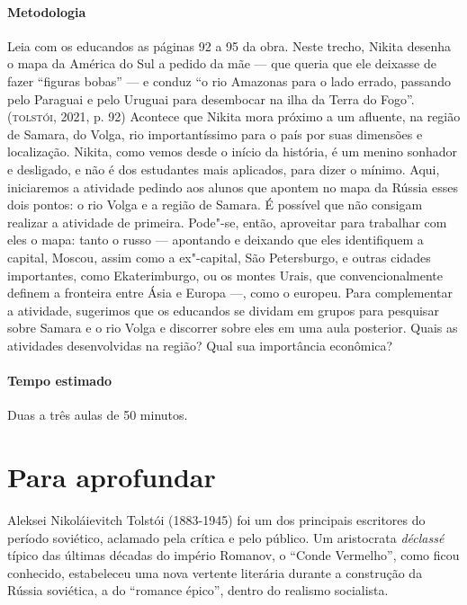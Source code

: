 \documentclass{article}
\begin{document}
\paragraph{Metodologia}
Leia com os educandos as páginas 92 a 95 da obra. Neste trecho, Nikita
desenha o mapa da América do Sul a pedido da mãe --- que queria que ele
deixasse de fazer ``figuras bobas'' --- e conduz ``o rio Amazonas para o
lado errado, passando pelo Paraguai e pelo Uruguai para desembocar na
ilha da Terra do Fogo''. (\textsc{tolstói}, 2021, p. 92) Acontece que Nikita mora
próximo a um afluente, na região de Samara, do Volga, rio
importantíssimo para o país por suas dimensões e localização. Nikita,
como vemos desde o início da história, é um menino sonhador e desligado,
e não é dos estudantes mais aplicados, para dizer o mínimo. Aqui,
iniciaremos a atividade pedindo aos alunos que apontem no mapa da Rússia
esses dois pontos: o rio Volga e a região de Samara. É possível que não
consigam realizar a atividade de primeira. Pode"-se, então, aproveitar
para trabalhar com eles o mapa: tanto o russo --- apontando e deixando
que eles identifiquem a capital, Moscou, assim como a ex"-capital, São
Petersburgo, e outras cidades importantes, como Ekaterimburgo, ou os
montes Urais, que convencionalmente definem a fronteira entre Ásia e
Europa ---, como o europeu. Para complementar a atividade, sugerimos que
os educandos se dividam em grupos para pesquisar sobre Samara e o rio
Volga e discorrer sobre eles em uma aula posterior. Quais as atividades
desenvolvidas na região? Qual sua importância econômica?

\paragraph{Tempo estimado} Duas a três aulas de 50 minutos.

\section{Para aprofundar}

Aleksei Nikoláievitch Tolstói
(1883-1945) foi um dos principais escritores do período soviético,
aclamado pela crítica e pelo público. Um aristocrata \emph{déclassé}
típico das últimas décadas do império Romanov, o ``Conde Vermelho'',
como ficou conhecido, estabeleceu uma nova vertente literária durante a
construção da Rússia soviética, a do ``romance épico'', dentro do
realismo socialista.
\end{document}
